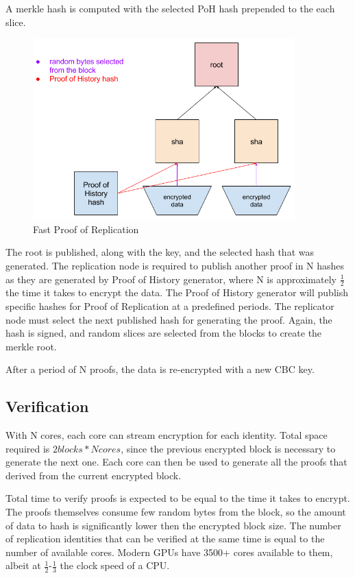 \documentclass[12pt]{article}
\begin{document}
A merkle hash is computed with the selected PoH hash prepended to the each slice.

\begin{figure}[h]
  \begin{center}
    \centering
    \includegraphics[width=0.9\textwidth]{figures/por_001.png}
    \caption[Fig 8]{Fast Proof of Replication\label{fig_8}}
  \end{center}
  \end{figure}

The root is published, along with the key, and the selected hash that was generated. The replication node is required to publish another proof in N hashes as they are generated by Proof of History generator, where N is approximately \(\frac{1}{2}\) the time it takes to encrypt the data. The Proof of History generator will publish specific hashes for Proof of Replication at a predefined periods. The replicator node must select the next published hash for generating the proof. Again, the hash is signed, and random slices are selected from the blocks to create the merkle root.

After a period of N proofs, the data is re-encrypted with a new CBC key.
\subsection{Verification}

With N cores, each core can stream encryption for each identity. Total space required is \(2 blocks * N cores\), since the previous encrypted block is necessary to generate the next one. Each core can then be used to generate all the proofs that derived from the current encrypted block.

Total time to verify proofs is expected to be equal to the time it takes to encrypt. The proofs themselves consume few random bytes from the block, so the amount of data to hash is significantly lower then the encrypted block size. The number of replication identities that can be verified at the same time is equal to the number of available cores. Modern GPUs have 3500+ cores available to them, albeit at \(\frac{1}{2}\)-\(\frac{1}{3}\) the clock speed of a CPU.
\end{document}
